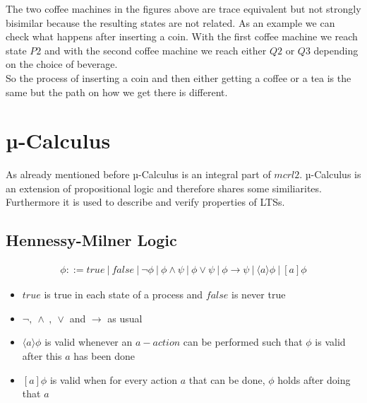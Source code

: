 \documentclass{report}
\begin{document}
  The two coffee machines in the figures above are trace equivalent but not strongly bisimilar because the resulting states are not related. As an example we can check what happens after inserting a coin. With the first coffee machine we reach state $P2$ and with the second coffee machine we reach either $Q2$ or $Q3$ depending on the choice of beverage.\\
  So the process of inserting a coin and then either getting a coffee or a tea is the same but the path on how we get there is different.

  \section{µ-Calculus}
  As already mentioned before µ-Calculus is an integral part of $mcrl2$. µ-Calculus is an extension of propositional logic and therefore shares some similiarites. \\
  Furthermore it is used to describe and verify properties of LTSs.

  \subsection{Hennessy-Milner Logic}
  \begin{align*}
    \phi ::= \mathit{true}\ |\ \mathit{false}\ |\ \neg \phi\ |\ \phi \land \psi\ |\ \phi \lor \psi\ |\ \phi \to \psi\ |\ \langle a \rangle \phi \ |\ [a]\phi
  \end{align*}
  \begin{itemize}
    \item $\mathit{true}$ is true in each state of a process and $\mathit{false}$ is never true
    \item $\neg ,\ \land\ ,\ \lor$ and $\to$ as usual
    \item $\langle a \rangle \phi$ is valid whenever an $a-action$ can be performed such that $\phi$ is valid after this $a$ has been done
    \item $[a]\phi$ is valid when for every action $a$ that can be done, $\phi$ holds after doing that $a$
  \end{itemize}
\end{document}
